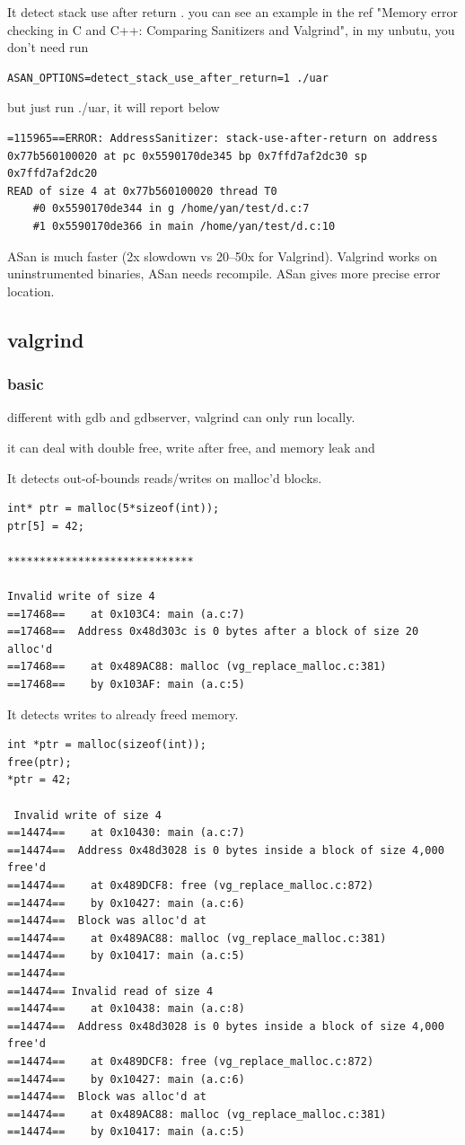 \documentclass[paper=8.5in:11in, twoside, 12pt, pagesize=pdftex]{book}
\begin{document}
It detect stack use after return . you can see an example in the ref "Memory error checking in C and C++: Comparing Sanitizers and Valgrind",  in my unbutu, you don't need run
\begin{lstlisting}
ASAN_OPTIONS=detect_stack_use_after_return=1 ./uar
\end{lstlisting}
but just run ./uar, it will report below 
\begin{lstlisting}
=115965==ERROR: AddressSanitizer: stack-use-after-return on address 0x77b560100020 at pc 0x5590170de345 bp 0x7ffd7af2dc30 sp 0x7ffd7af2dc20
READ of size 4 at 0x77b560100020 thread T0
    #0 0x5590170de344 in g /home/yan/test/d.c:7
    #1 0x5590170de366 in main /home/yan/test/d.c:10
\end{lstlisting}

 
ASan is much faster (2x slowdown vs 20–50x for Valgrind). Valgrind works on uninstrumented binaries, ASan needs recompile. ASan gives more precise error location.

\subsection{valgrind}

\subsubsection{basic}
different with gdb and gdbserver, valgrind can only run locally. 

it can deal with double free, write after free, and memory leak and 

It detects out-of-bounds reads/writes on malloc’d blocks.
\begin{lstlisting}
int* ptr = malloc(5*sizeof(int));
ptr[5] = 42;

*****************************

Invalid write of size 4
==17468==    at 0x103C4: main (a.c:7)
==17468==  Address 0x48d303c is 0 bytes after a block of size 20 alloc'd
==17468==    at 0x489AC88: malloc (vg_replace_malloc.c:381)
==17468==    by 0x103AF: main (a.c:5)
\end{lstlisting}


It detects writes to already freed memory.
\begin{lstlisting}
int *ptr = malloc(sizeof(int));
free(ptr);
*ptr = 42;

 Invalid write of size 4
==14474==    at 0x10430: main (a.c:7)
==14474==  Address 0x48d3028 is 0 bytes inside a block of size 4,000 free'd
==14474==    at 0x489DCF8: free (vg_replace_malloc.c:872)
==14474==    by 0x10427: main (a.c:6)
==14474==  Block was alloc'd at
==14474==    at 0x489AC88: malloc (vg_replace_malloc.c:381)
==14474==    by 0x10417: main (a.c:5)
==14474==
==14474== Invalid read of size 4
==14474==    at 0x10438: main (a.c:8)
==14474==  Address 0x48d3028 is 0 bytes inside a block of size 4,000 free'd
==14474==    at 0x489DCF8: free (vg_replace_malloc.c:872)
==14474==    by 0x10427: main (a.c:6)
==14474==  Block was alloc'd at
==14474==    at 0x489AC88: malloc (vg_replace_malloc.c:381)
==14474==    by 0x10417: main (a.c:5)
\end{lstlisting}
\end{document}
